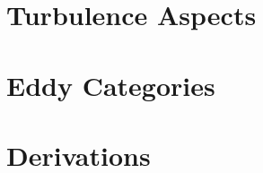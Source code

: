 


%


%
%
%
%
%
%


\appendix
\small
\begin{appendices}
\chapter{Turbulence Aspects}

\chapter{Eddy Categories}

\chapter{Derivations}

\end{appendices}
\FloatBarrier

